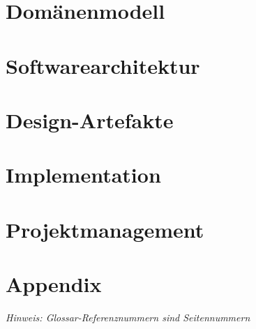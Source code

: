 \documentclass[11pt,ngerman]{article}
\begin{document}
    \section{Domänenmodell}

    \section{Softwarearchitektur}

    \section{Design-Artefakte}

    \section{Implementation}

    \section{Projektmanagement}


     \newpage

    \section{Appendix}
    \textit{Hinweis: Glossar-Referenznummern sind Seitennummern}
    \printglossary
\end{document}

